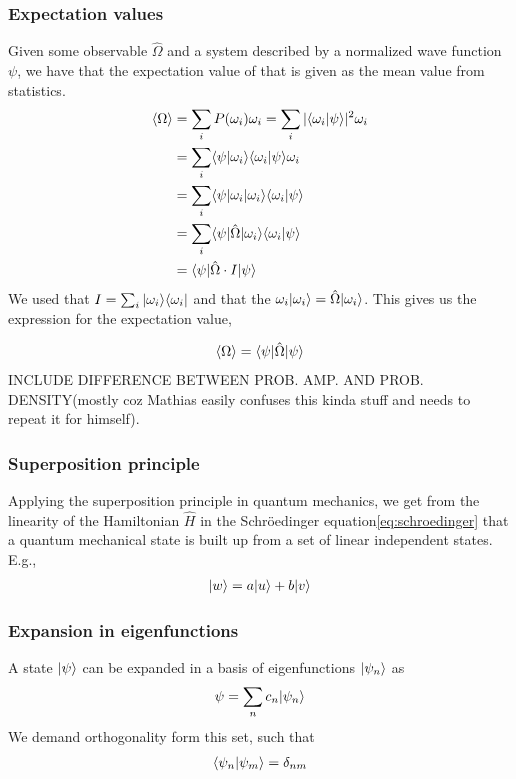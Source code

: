 \subsubsection{Expectation values}
Given some observable $\hat{\Omega}$ and a system described by a normalized wave function $\psi$, we have that the expectation value of that is given as the mean value from statistics.
\begin{align*}
	\langle \Omega \rangle &= \sum_i P(\omega_i) \omega_i = \sum_i |\langle{\omega_i}|\psi\rangle|^2\omega_i \\
	&= \sum_i \langle{\psi}|\omega_i\rangle \langle\omega_i |{\psi}\rangle \omega_i \\
	&= \sum_i \langle{\psi}| \omega_i |{\omega_i}\rangle \langle\omega_i |{\psi}\rangle \\
	&= \sum_i \langle{\psi}| \hat{\Omega} |{\omega_i}\rangle \langle\omega_i |{\psi}\rangle \\
	&= \langle{\psi}| \hat{\Omega} \cdot I |{\psi}\rangle \\
\end{align*}
We used that $I = \sum_i |{\omega_i}\rangle\langle{\omega_i}|$ and that the $\omega_i|{{\omega_i}}\rangle = \hat{\Omega}|{\omega_i}\rangle$. This gives us the expression for the expectation value,

\begin{align}
	\left\langle{\Omega}\right\rangle = \langle{\psi}| \hat{\Omega} |{\psi}\rangle
	\label{eq:expectation-value}
\end{align}
INCLUDE DIFFERENCE BETWEEN PROB. AMP. AND PROB. DENSITY(mostly coz Mathias easily confuses this kinda stuff and needs to repeat it for himself).

\subsubsection{Superposition principle}
Applying the superposition principle in quantum mechanics, we get from the linearity of the Hamiltonian $\hat{H}$ in the Schröedinger equation\eqref{eq:schroedinger} that a quantum mechanical state is built up from a set of linear independent states. E.g.,
\begin{align*}
	|{w}\rangle = a|{u}\rangle + b|{v}\rangle
\end{align*}

\subsubsection{Expansion in eigenfunctions}
A state $|{\psi}\rangle$ can be expanded in a basis of eigenfunctions $|{\psi_n}\rangle$ as
\begin{align}
	\psi = \sum_n c_n |{\psi_n}\rangle
	\label{eq:eigenfunction-expansion}
\end{align}
We demand orthogonality form this set, such that 
\begin{align}
	\langle{\psi_n}|\psi_m\rangle = \delta_{nm}
	\label{eq:eig-func-orthogonality}
\end{align}

